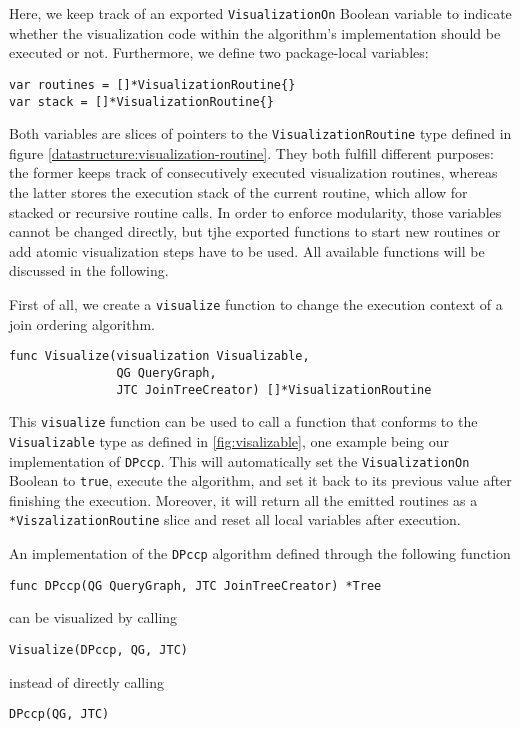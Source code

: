 Here, we keep track of an exported \texttt{VisualizationOn} Boolean variable to indicate whether the visualization code within the algorithm's implementation should be executed or not. Furthermore, we define two package-local variables:
\vspace{0.2cm}
\begin{verbatim}
var routines = []*VisualizationRoutine{}
var stack = []*VisualizationRoutine{}
\end{verbatim}
\vspace{0.2cm}
Both variables are slices of pointers to the \texttt{VisualizationRoutine} type defined in figure \ref{datastructure:visualization-routine}. They both fulfill different purposes: the former keeps track of consecutively executed visualization routines, whereas the latter stores the  execution stack of the current routine, which allow for stacked or recursive routine calls. In order to enforce modularity, those variables cannot be changed directly, but tjhe exported functions to start new routines or add atomic visualization steps have to be used. All available functions will be discussed in the following.

First of all, we create a \texttt{visualize} function to change the execution context of a join ordering algorithm.
\begin{verbatim}
func Visualize(visualization Visualizable, 
               QG QueryGraph, 
               JTC JoinTreeCreator) []*VisualizationRoutine
\end{verbatim}

This \texttt{visualize} function can be used to call a function that conforms to the \texttt{Visualizable} type as defined in \ref{fig:visalizable}, one example being our implementation of \texttt{DPccp}. This will automatically set the \texttt{VisualizationOn} Boolean to \texttt{true}, execute the algorithm, and set it back to its previous value after finishing the execution. Moreover, it will return all the emitted routines as a \texttt{*ViszalizationRoutine} slice and reset all local variables after execution.

\begin{example}
    An implementation of the \texttt{DPccp} algorithm defined through the following function
    \begin{verbatim}
func DPccp(QG QueryGraph, JTC JoinTreeCreator) *Tree
    \end{verbatim}
    can be visualized by calling
    \begin{verbatim}
Visualize(DPccp, QG, JTC)
    \end{verbatim}
    instead of directly calling
    \begin{verbatim}
DPccp(QG, JTC)
    \end{verbatim}
\end{example}

